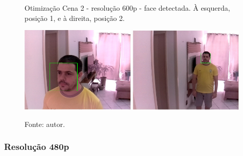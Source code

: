 \begin{figure}[H]
    \centering
    \caption[Otimização Cena 2 - resolução 600p - face detectada. À esquerda posição 1 e à direita, posição 2]{Otimização Cena 2 - resolução 600p - face detectada. À esquerda, posição 1, e à direita, posição 2.}
    \includegraphics[width=0.49\textwidth]{Cap4_Experimentos_Realizados/Figures/cena2_800x600_pos1_face.jpg}
    \includegraphics[width=0.49\textwidth]{Cap4_Experimentos_Realizados/Figures/cena2_800x600_pos2_face.jpg}
    \caption*{Fonte: autor.}
    \label{fig:otimizacaoCena2_600p_faces}
\end{figure}

\subsubsection{Resolução 480p} \label{sssec:resolution2-2}

